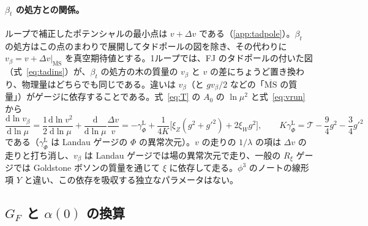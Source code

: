 \documentclass[a4paper,10pt]{ltjsarticle}
\newcommand{\dd}{\mathrm{d}}
\newcommand{\MSbar}{\overline{\mathrm{MS}}}
\begin{document}
\paragraph{$\beta_t$ の処方との関係。}ループで補正したポテンシャルの最小点は $v+\Delta v$ である（\ref{app:tadpole}）。$\beta_t$ の処方はこの点のまわりで展開してタドポールの図を除き、その代わりに $v_\beta=v+\Delta v|_{\MSbar}$ を真空期待値とする。1ループでは、FJ のタドポールの付いた図（式~\eqref{eq:tadins}）が、$\beta_t$ の処方の木の質量の $v_\beta$ と $v$ の差にちょうど置き換わり、物理量はどちらでも同じである。違いは $v_\beta$（と $g v_\beta/2$ などの「$\MSbar$ の質量」）がゲージに依存することである。式~\eqref{eq:T} の $A_0$ の $\ln\mu^2$ と式~\eqref{eq:vrun} から
\begin{equation}
\frac{\dd\ln v_\beta}{\dd\ln\mu}=\frac12\frac{\dd\ln v^2}{\dd\ln\mu}+\frac{\dd}{\dd\ln\mu}\frac{\Delta v}v
=-\gamma_\Phi^{\mathrm L}+\frac1{4K}\bigl[\xi_Z(g^2+g'^2)+2\xi_Wg^2\bigr],\qquad
K\gamma_\Phi^{\mathrm L}=\mathcal T-\frac94g^2-\frac34g'^2
\label{eq:vbeta}
\end{equation}
である（$\gamma_\Phi^{\mathrm L}$ は Landau ゲージの $\Phi$ の異常次元）。$v$ の走りの $1/\lambda$ の項は $\Delta v$ の走りと打ち消し、$v_\beta$ は Landau ゲージでは場の異常次元で走り、一般の $R_\xi$ ゲージでは Goldstone ボソンの質量を通じて $\xi$ に依存して走る。$\phi^3$ のノートの線形項 $Y$ と違い、この依存を吸収する独立なパラメータはない。

\subsection{$G_F$ と $\alpha(0)$ の換算}\label{sec:matching}
\end{document}
